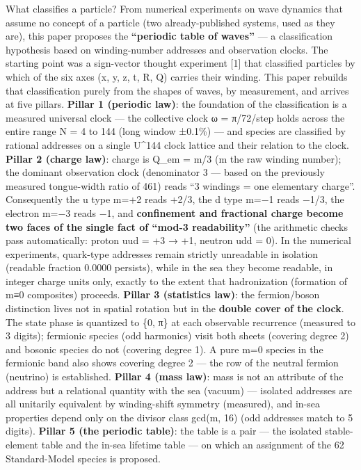 \documentclass[
]{article}
\begin{document}
What classifies a particle? From numerical experiments on wave dynamics
that assume no concept of a particle (two already-published systems,
used as they are), this paper proposes the \textbf{``periodic table of
waves''} --- a classification hypothesis based on winding-number
addresses and observation clocks. The starting point was a sign-vector
thought experiment {[}1{]} that classified particles by which of the six
axes (x, y, z, t, R, Q) carries their winding. This paper rebuilds that
classification purely from the shapes of waves, by measurement, and
arrives at five pillars. \textbf{Pillar 1 (periodic law)}: the
foundation of the classification is a measured universal clock --- the
collective clock ω = π/72/step holds across the entire range N = 4 to
144 (long window ±0.1\%) --- and species are classified by rational
addresses on a single U\^{}144 clock lattice and their relation to the
clock. \textbf{Pillar 2 (charge law)}: charge is Q\_em = m/3 (m the raw
winding number); the dominant observation clock (denominator 3 --- based
on the previously measured tongue-width ratio of 461) reads ``3 windings
= one elementary charge''. Consequently the u type m=+2 reads +2/3, the
d type m=−1 reads −1/3, the electron m=−3 reads −1, and
\textbf{confinement and fractional charge become two faces of the single
fact of ``mod-3 readability''} (the arithmetic checks pass
automatically: proton uud = +3 → +1, neutron udd = 0). In the numerical
experiments, quark-type addresses remain strictly unreadable in
isolation (readable fraction 0.0000 persists), while in the sea they
become readable, in integer charge units only, exactly to the extent
that hadronization (formation of m≡0 composites) proceeds.
\textbf{Pillar 3 (statistics law)}: the fermion/boson distinction lives
not in spatial rotation but in the \textbf{double cover of the clock}.
The state phase is quantized to \{0, π\} at each observable recurrence
(measured to 3 digits); fermionic species (odd harmonics) visit both
sheets (covering degree 2) and bosonic species do not (covering degree
1). A pure m=0 species in the fermionic band also shows covering degree
2 --- the row of the neutral fermion (neutrino) is established.
\textbf{Pillar 4 (mass law)}: mass is not an attribute of the address
but a relational quantity with the sea (vacuum) --- isolated addresses
are all unitarily equivalent by winding-shift symmetry (measured), and
in-sea properties depend only on the divisor class gcd(m, 16) (odd
addresses match to 5 digits). \textbf{Pillar 5 (the periodic table)}:
the table is a pair --- the isolated stable-element table and the in-sea
lifetime table --- on which an assignment of the 62 Standard-Model
species is proposed.
\end{document}
